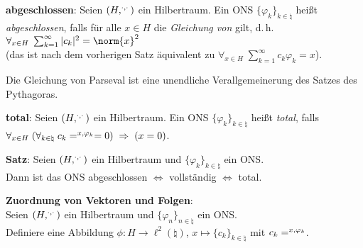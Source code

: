\textbf{abgeschlossen}:
Seien $(H, \sp{\cdot, \cdot})$ ein Hilbertraum.
Ein ONS $\{\varphi_k\}_{k \in \natural}$ heißt \emph{abgeschlossen}, falls
für alle $x \in H$ die \emph{Gleichung von } gilt, d.\,h.
$\forall_{x \in H}\; \sum_{k=1}^\infty |c_k|^2 = \norm{x}^2$\\
(das ist nach dem vorherigen Satz äquivalent zu
$\forall_{x \in H}\; \sum_{k=1}^\infty c_k \varphi_k = x$).

Die Gleichung von Parseval ist eine unendliche Verallgemeinerung des
Satzes des Pythagoras.

\textbf{total}:
Seien $(H, \sp{\cdot, \cdot})$ ein Hilbertraum.
Ein ONS $\{\varphi_k\}_{k \in \natural}$ heißt \emph{total}, falls\\
$\forall_{x \in H}\; (\forall_{k \in \natural}\;
c_k = \sp{x, \varphi_k} = 0) \;\Rightarrow\; (x = 0)$.

\textbf{Satz}:
Seien $(H, \sp{\cdot, \cdot})$ ein Hilbertraum und
$\{\varphi_k\}_{k \in \natural}$ ein ONS.\\
Dann ist das ONS abgeschlossen $\iff$ vollständig $\iff$ total.

\linie
\pagebreak

\textbf{Zuordnung von Vektoren und Folgen}:\\
Seien $(H, \sp{\cdot, \cdot})$ ein Hilbertraum und
$\{\varphi_n\}_{n \in \natural}$ ein ONS.\\
Definiere eine Abbildung $\phi\colon H \rightarrow \ell^2(\natural)$,
$x \mapsto \{c_k\}_{k \in \natural}$ mit $c_k = \sp{x, \varphi_k}$.

